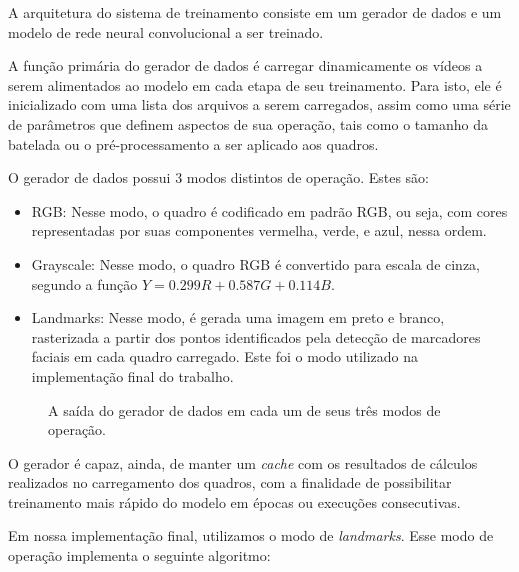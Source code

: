 A arquitetura do sistema de treinamento consiste em um gerador de dados e um modelo de rede neural convolucional a ser treinado.

% 

A função primária do gerador de dados é carregar dinamicamente os vídeos a serem alimentados ao modelo em cada etapa de seu treinamento. Para isto, ele é inicializado com uma lista dos arquivos a serem carregados, assim como uma série de parâmetros que definem aspectos de sua operação, tais como o tamanho da batelada ou o pré-processamento a ser aplicado aos quadros.

O gerador de dados possui 3 modos distintos de operação. Estes são:
\begin{itemize}
    \item RGB: Nesse modo, o quadro é codificado em padrão RGB, ou seja, com cores representadas por suas componentes vermelha, verde, e azul, nessa ordem.
    \item Grayscale: Nesse modo, o quadro RGB é convertido para escala de cinza, segundo a função $Y = 0.299 R + 0.587 G + 0.114 B$.
    \item Landmarks: Nesse modo, é gerada uma imagem em preto e branco, rasterizada a partir dos pontos identificados pela detecção de marcadores faciais em cada quadro carregado. Este foi o modo utilizado na implementação final do trabalho.
\end{itemize}

\begin{figure}[ht]
    \centering
    
    
    
    \caption{A saída do gerador de dados em cada um de seus três modos de operação.}
    \label{fig:train_metrics_evo}
\end{figure}

O gerador é capaz, ainda, de manter um \textit{cache} com os resultados de cálculos realizados no carregamento dos quadros, com a finalidade de possibilitar treinamento mais rápido do modelo em épocas ou execuções consecutivas.

Em nossa implementação final, utilizamos o modo de \textit{landmarks}. Esse modo de operação implementa o seguinte algoritmo:

